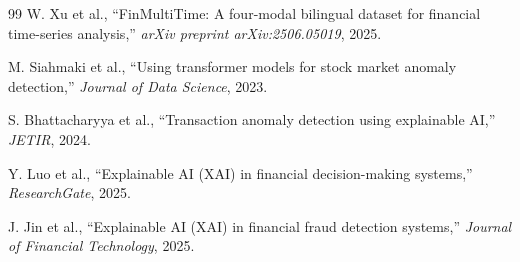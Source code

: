 \documentclass[11pt,a4paper,twoside]{article}
\begin{document}
\begin{thebibliography}{99}
W. Xu et al.,
``FinMultiTime: A four-modal bilingual dataset for financial time-series analysis,''
\emph{arXiv preprint arXiv:2506.05019}, 2025.

M. Siahmaki et al.,
``Using transformer models for stock market anomaly detection,''
\emph{Journal of Data Science}, 2023.

S. Bhattacharyya et al.,
``Transaction anomaly detection using explainable AI,''
\emph{JETIR}, 2024.

Y. Luo et al.,
``Explainable AI (XAI) in financial decision-making systems,''
\emph{ResearchGate}, 2025.

J. Jin et al.,
``Explainable AI (XAI) in financial fraud detection systems,''
\emph{Journal of Financial Technology}, 2025.

\end{thebibliography}
\endgroup
\end{document}
